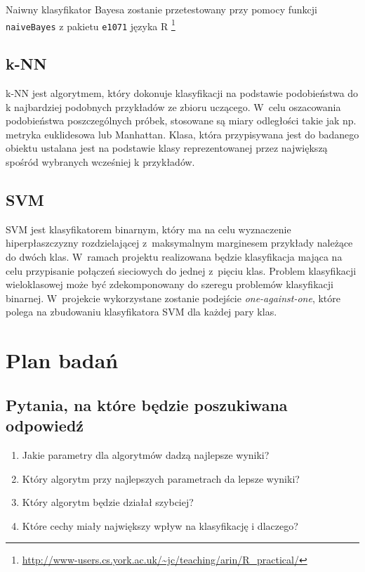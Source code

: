 \documentclass[a4paper, 12pt]{article}
\begin{document}
Naiwny klasyfikator Bayesa zostanie przetestowany przy pomocy funkcji \texttt{naiveBayes} z pakietu \texttt{e1071} języka R
\footnote{\url{http://www-users.cs.york.ac.uk/~jc/teaching/arin/R_practical/}}

\subsection{k-NN}
k-NN jest algorytmem, który dokonuje klasyfikacji na podstawie podobieństwa do k najbardziej podobnych przykładów ze zbioru uczącego. W~celu oszacowania podobieństwa poszczególnych próbek, stosowane są miary odległości takie jak np. metryka euklidesowa lub Manhattan. Klasa, która przypisywana jest do badanego obiektu ustalana jest na podstawie klasy reprezentowanej przez największą spośród wybranych wcześniej k przykładów.

\subsection{SVM}
SVM jest klasyfikatorem binarnym, który ma na celu wyznaczenie hiperpłaszczyzny rozdzielającej z~maksymalnym marginesem przykłady należące do dwóch klas. W~ramach projektu realizowana będzie klasyfikacja mająca na celu przypisanie połączeń sieciowych do jednej z~pięciu klas. Problem klasyfikacji wieloklasowej może być zdekomponowany do szeregu problemów klasyfikacji binarnej. W~projekcie wykorzystane zostanie podejście \textit{one-against-one}, które polega na zbudowaniu klasyfikatora SVM dla każdej pary klas.

\section{Plan badań}

\subsection{Pytania, na które będzie poszukiwana odpowiedź}

\begin{enumerate}
 \item Jakie parametry dla algorytmów dadzą najlepsze wyniki?
 \item Który algorytm przy najlepszych parametrach da lepsze wyniki?
 \item Który algorytm będzie działał szybciej?
 \item Które cechy miały największy wpływ na klasyfikację i dlaczego?
\end{enumerate}
\end{document}
